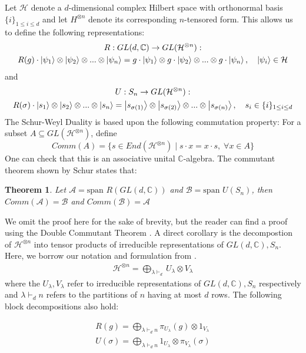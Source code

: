 \documentclass[11pt]{article}%
\newtheorem{thm}{Theorem}
\begin{document}
Let $\mathcal{H}$ denote a $d$-dimensional complex Hilbert space with orthonormal basis $\{i\}_{1 \leq i \leq d}$ and let $H^{\otimes n}$ denote its corresponding $n$-tensored form.
This allows us to define the following representations:
\begin{gather*}
  R: GL(d,\mathbb{C}) \rightarrow GL(\mathcal{H}^{\otimes n}): \\
  R(g) \cdot \ket{\psi_1} \otimes \ket{\psi_2} \otimes ... \otimes \ket{\psi_n} = g \cdot \ket{\psi_1} \otimes g \cdot \ket{\psi_2} \otimes ... \otimes g \cdot \ket{\psi_n}, \quad \ket{\psi_i} \in \mathcal{H}
\end{gather*}
and
\begin{gather*}
  U: S_n \rightarrow GL(\mathcal{H}^{\otimes n}): \\
  R(\sigma) \cdot \ket{s_1} \otimes \ket{s_2} \otimes ... \otimes \ket{s_n} = \ket{s_{\sigma(1)}} \otimes \ket{s_{\sigma(2)}} \otimes ... \otimes  \ket{s_{\sigma(n)}}, \quad s_i \in \{i\}_{1 \leq i \leq d}
\end{gather*}
The Schur-Weyl Duality is based upon the following commutation property: For a subset $A \subseteq GL(\mathcal{H}^{\otimes n})$, define
$$ Comm(A) = \{s \in End(\mathcal{H}^{\otimes n})\mid s \cdot x = x \cdot s, \; \forall x \in A \} $$
One can check that this is an associative unital $\mathbb{C}$-algebra. The commutant theorem shown by Schur states that:
\begin{thm}
  Let $\mathcal{A} = \text{span }{R(GL(d,\mathbb{C}))}$ and $\mathcal{B} = \text{span }U(S_n)$, then $Comm(\mathcal{A}) = \mathcal{B}$ and $Comm(\mathcal{B}) = \mathcal{A}$
\end{thm}

\noindent We omit the proof here for the sake of brevity, but the reader can find a proof using the Double Commutant Theorem \cite{GW}. A direct corollary is the decompostion of $\mathcal{H}^{\otimes n}$ into tensor products of irreducible representations of $GL(d,\mathbb{C}), S_n$. Here, we borrow our notation and formulation from \cite{botero}.
\begin{gather}
  \mathcal{H}^{\otimes n} = \bigoplus_{\lambda \vdash_d } U_\lambda \otimes V_\lambda
\end{gather}
where the $U_\lambda, V_\lambda$ refer to irreducible representations of $GL(d, \mathbb{C}), S_n$ respectively and $\lambda \vdash_d n$ refers to the partitions of $n$ having at most $d$ rows. The following block decompositions also hold:

\begin{gather}\label{matdecomp}
    R(g) = \bigoplus_{\lambda \vdash_d n} \pi_{U_{\lambda}}(g) \otimes 1_{V_{\lambda}} \\
    U(\sigma) = \bigoplus_{\lambda \vdash_d n} 1_{U_{\lambda}} \otimes \pi_{V_{\lambda}}(\sigma)
\end{gather}
\end{document}
